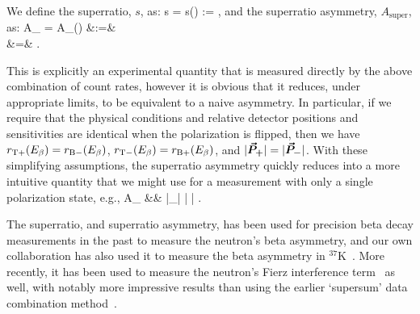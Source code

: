 We define the superratio, $s$, as:
\bea
s \;\;=\;\; s(\Ebeta) \;\;:=\;\;  , 
\eea
and the superratio asymmetry, $A_{\mathrm{super}}$, as:
\bea
A_{} \;\;=\;\; A_{}(\Ebeta) &:=&  
\\
&=& .
\eea
%

This is explicitly an experimental quantity that is measured directly by the above combination of count rates, however it is obvious that it reduces, under appropriate limits, to be equivalent to a naive asymmetry.  In particular, if we require that the physical conditions and relative detector positions and sensitivities are identical when the polarization is flipped, then we have $r_{\mathrm T+}(E_{\beta}) = r_{\mathrm B-}(E_{\beta})$, $r_{\mathrm T-}(E_{\beta}) = r_{\mathrm B+}(E_{\beta})$, and $|\bm{\vec{P}}_{\bm{+}}| = |\bm{\vec{P}}_{\bm{-}}|$.
%
With these simplifying assumptions, the superratio asymmetry quickly reduces into a more intuitive quantity that we might use for a measurement with only a single polarization state, e.g.,  
\bea
A_{} &\rightarrow&  
\;\;\; \xrightarrow[\bFierz = 0]{} \;\;\; \Abeta {} |\vecP_{\bm{+}}| \: \langle | \cos\theta | \rangle . 
\label{eq:singlepol_asymmetry}
\eea

The superratio, and superratio asymmetry, has been used for precision beta decay measurements in the past to measure the neutron's beta asymmetry\cite{UCNA_first_superratio}, and our own collaboration has also used it to measure the beta asymmetry in $^{37}$K~\cite{ben_Abeta}.  More recently, it has been used to measure the neutron's Fierz interference term~\cite{UCNAfierz2020}\cite{Saul2020} as well, with notably more impressive results than using the earlier `supersum' data combination method~\cite{UCNA_first_Fierz}.  


